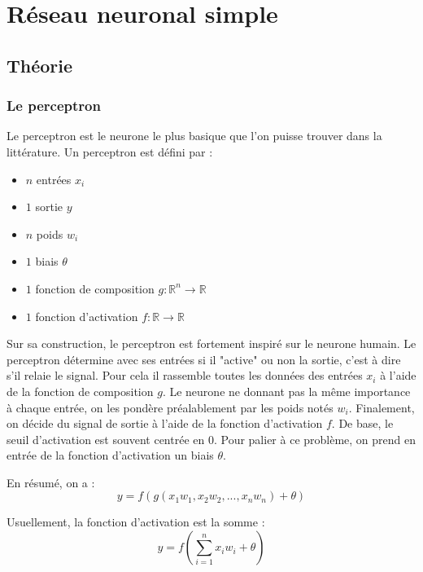 
\chapter{Réseau neuronal simple}

\section{Théorie}

\subsection{Le perceptron}

Le perceptron est le neurone le plus basique que l'on puisse trouver dans la littérature. Un perceptron est défini par :
\begin{itemize}
\item $n$ entrées $x_i$
\item $1$ sortie $y$
\item $n$ poids $w_i$
\item $1$ biais $\theta$
\item $1$ fonction de composition $g : \mathbb{R}^n \to \mathbb{R}$
\item $1$ fonction d'activation $f : \mathbb{R} \to \mathbb{R}$
\end{itemize}

\vspace{\parskip}
Sur sa construction, le perceptron est fortement inspiré sur le neurone humain. Le perceptron détermine avec ses entrées si il "active" ou non la sortie, c'est à dire s'il relaie le signal. Pour cela il rassemble toutes les données des entrées $x_i$ à l'aide de la fonction de composition $g$. Le neurone ne donnant pas la même importance à chaque entrée, on les pondère préalablement par les poids notés $w_i$. Finalement, on décide du signal de sortie à l'aide de la fonction d'activation $f$. De base, le seuil d'activation est souvent centrée en $0$. Pour palier à ce problème, on prend en entrée de la fonction d'activation un biais $\theta$.

\medskip

En résumé, on a :
\[y = f(g(x_1w_1, x_2w_2, ... , x_nw_n) + \theta) \]

\medskip

Usuellement, la fonction d'activation est la somme :
\[y = f(\sum_{i=1}^n x_iw_i + \theta) \]

\medskip

